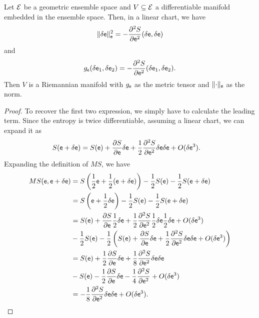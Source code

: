 \begin{thrm}
	Let $\mathcal{E}$ be a geometric ensemble space and $V \subseteq \mathcal{E}$ a differentiable manifold embedded in the ensemble space. Then, in a linear chart, we have
	$$ \lVert \delta \mathsf{e} \rVert_{\mathsf{e}}^2 = - \frac{\partial^2 S}{\partial \mathsf{e}^2}(\delta \mathsf{e} , \delta \mathsf{e}) $$
	and 
	$$ g_{\mathsf{e}}( \delta \mathsf{e}_1, \delta \mathsf{e}_2 ) = - \frac{\partial^2 S}{\partial \mathsf{e} ^2}( \delta \mathsf{e}_1, \delta \mathsf{e}_2 ).$$
	Then $V$ is a Riemannian manifold with $g_{\mathsf{e}}$ as the metric tensor and $\lVert \cdot \rVert_{\mathsf{e}}$ as the norm.
\end{thrm}

\begin{proof}
	To recover the first two expression, we simply have to calculate the leading term. Since the entropy is twice differentiable, assuming a linear chart, we can expand it as
\begin{equation}
	\begin{aligned}
		S(\mathsf{e} + \delta \mathsf{e}) &= S(\mathsf{e}) + \frac{\partial S}{\partial \mathsf{e}} \delta \mathsf{e} + \frac{1}{2} \frac{\partial^2 S}{\partial \mathsf{e}^2} \delta \mathsf{e} \delta \mathsf{e} + O(\delta \mathsf{e} ^3).
	\end{aligned}
\end{equation}
Expanding the definition of $MS$, we have
\begin{equation}
	\begin{aligned}
		MS(\mathsf{e}, \mathsf{e} + \delta \mathsf{e}) &= S\left(\frac{1}{2} \mathsf{e} + \frac{1}{2}(\mathsf{e} + \delta \mathsf{e}) \right) - \frac{1}{2} S(\mathsf{e}) - \frac{1}{2} S(\mathsf{e}+\delta \mathsf{e}) \\
		&=  S\left(\mathsf{e} + \frac{1}{2} \delta \mathsf{e} \right) - \frac{1}{2} S(\mathsf{e}) - \frac{1}{2} S(\mathsf{e}+\delta \mathsf{e}) \\
		&= S(\mathsf{e}) + \frac{\partial S}{\partial \mathsf{e}} \frac{1}{2}\delta \mathsf{e} + \frac{1}{2} \frac{\partial^2 S}{\partial \mathsf{e}^2} \frac{1}{2}\delta \mathsf{e} \frac{1}{2}\delta \mathsf{e} + O(\delta \mathsf{e} ^3) \\
		&- \frac{1}{2} S(\mathsf{e}) - \frac{1}{2} \left( S(\mathsf{e}) + \frac{\partial S}{\partial \mathsf{e}} \delta \mathsf{e} + \frac{1}{2} \frac{\partial^2 S}{\partial \mathsf{e}^2} \delta \mathsf{e} \delta \mathsf{e} + O(\delta \mathsf{e} ^3) \right) \\
		&= S(\mathsf{e}) + \frac{1}{2} \frac{\partial S}{\partial \mathsf{e}} \delta \mathsf{e} + \frac{1}{8} \frac{\partial^2 S}{\partial \mathsf{e}^2} \delta \mathsf{e} \delta \mathsf{e} \\
		&- S(\mathsf{e}) - \frac{1}{2} \frac{\partial S}{\partial \mathsf{e}} \delta \mathsf{e} - \frac{1}{4} \frac{\partial^2 S}{\partial \mathsf{e}^2} + O(\delta \mathsf{e} ^3) \\
		&= - \frac{1}{8} \frac{\partial^2 S}{\partial \mathsf{e}^2} \delta \mathsf{e} \delta \mathsf{e} + O(\delta \mathsf{e} ^3).
	\end{aligned}
\end{equation}


\end{proof}
